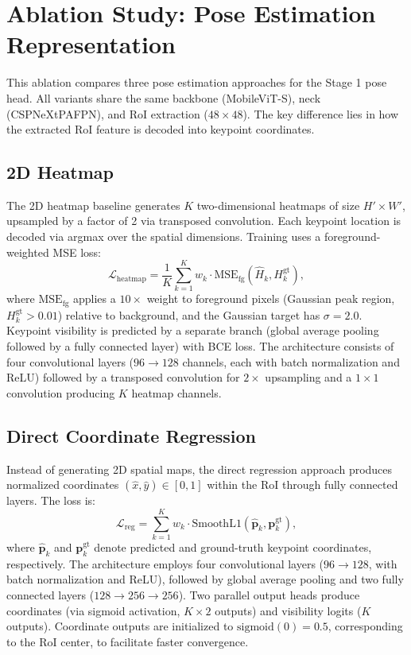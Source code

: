 \section{Ablation Study: Pose Estimation Representation}
\label{sec:ablation_pose}

This ablation compares three pose estimation approaches for the Stage 1 pose head. All variants share the same backbone (MobileViT-S), neck (CSPNeXtPAFPN), and RoI extraction ($48 \times 48$). The key difference lies in how the extracted RoI feature is decoded into keypoint coordinates.

\subsection{2D Heatmap}
\label{sec:pose_heatmap}

The 2D heatmap baseline generates $K$ two-dimensional heatmaps of size $H' \times W'$, upsampled by a factor of 2 via transposed convolution. Each keypoint location is decoded via argmax over the spatial dimensions. Training uses a foreground-weighted MSE loss:
\begin{equation}
\mathcal{L}_{\text{heatmap}} = \frac{1}{K} \sum_{k=1}^{K} w_k \cdot \text{MSE}_{\text{fg}}(\hat{H}_k, H_k^{\text{gt}}),
\label{eq:heatmap_loss}
\end{equation}
where $\text{MSE}_{\text{fg}}$ applies a $10\times$ weight to foreground pixels (Gaussian peak region, $H_k^{\text{gt}} > 0.01$) relative to background, and the Gaussian target has $\sigma = 2.0$. Keypoint visibility is predicted by a separate branch (global average pooling followed by a fully connected layer) with BCE loss. The architecture consists of four convolutional layers ($96 \to 128$ channels, each with batch normalization and ReLU) followed by a transposed convolution for $2\times$ upsampling and a $1 \times 1$ convolution producing $K$ heatmap channels.

\subsection{Direct Coordinate Regression}
\label{sec:pose_regression}

Instead of generating 2D spatial maps, the direct regression approach produces normalized coordinates $(\hat{x}, \hat{y}) \in [0, 1]$ within the RoI through fully connected layers. The loss is:
\begin{equation}
\mathcal{L}_{\text{reg}} = \sum_{k=1}^{K} w_k \cdot \text{SmoothL1}(\hat{\mathbf{p}}_k, \mathbf{p}_k^{\text{gt}}),
\label{eq:reg_loss}
\end{equation}
where $\hat{\mathbf{p}}_k$ and $\mathbf{p}_k^{\text{gt}}$ denote predicted and ground-truth keypoint coordinates, respectively. The architecture employs four convolutional layers ($96 \to 128$, with batch normalization and ReLU), followed by global average pooling and two fully connected layers ($128 \to 256 \to 256$). Two parallel output heads produce coordinates (via sigmoid activation, $K \times 2$ outputs) and visibility logits ($K$ outputs). Coordinate outputs are initialized to $\text{sigmoid}(0) = 0.5$, corresponding to the RoI center, to facilitate faster convergence.


